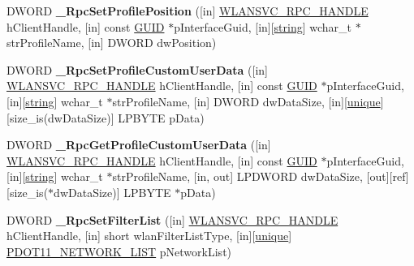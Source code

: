 \begin{DoxyCompactItemize}
\mbox{\label{interfacewlansvc__interface_a1b0f67c02052864e7d274e9784d0d6e6}} 
D\+W\+O\+RD {\bfseries \+\_\+\+Rpc\+Set\+Profile\+Position} (\mbox{[}in\mbox{]} \hyperlink{interfacevoid}{W\+L\+A\+N\+S\+V\+C\+\_\+\+R\+P\+C\+\_\+\+H\+A\+N\+D\+LE} h\+Client\+Handle, \mbox{[}in\mbox{]} const \hyperlink{interface_g_u_i_d}{G\+U\+ID} $\ast$p\+Interface\+Guid, \mbox{[}in\mbox{]}\mbox{[}\hyperlink{structstring}{string}\mbox{]} wchar\+\_\+t $\ast$str\+Profile\+Name, \mbox{[}in\mbox{]} D\+W\+O\+RD dw\+Position)
\item 
\mbox{\label{interfacewlansvc__interface_ab19ff62dcd0c317616f4c5b45f32a83c}} 
D\+W\+O\+RD {\bfseries \+\_\+\+Rpc\+Set\+Profile\+Custom\+User\+Data} (\mbox{[}in\mbox{]} \hyperlink{interfacevoid}{W\+L\+A\+N\+S\+V\+C\+\_\+\+R\+P\+C\+\_\+\+H\+A\+N\+D\+LE} h\+Client\+Handle, \mbox{[}in\mbox{]} const \hyperlink{interface_g_u_i_d}{G\+U\+ID} $\ast$p\+Interface\+Guid, \mbox{[}in\mbox{]}\mbox{[}\hyperlink{structstring}{string}\mbox{]} wchar\+\_\+t $\ast$str\+Profile\+Name, \mbox{[}in\mbox{]} D\+W\+O\+RD dw\+Data\+Size, \mbox{[}in\mbox{]}\mbox{[}\hyperlink{interfaceunique}{unique}\mbox{]}\mbox{[}size\+\_\+is(dw\+Data\+Size)\mbox{]} L\+P\+B\+Y\+TE p\+Data)
\item 
\mbox{\label{interfacewlansvc__interface_a38534f0b37ba05221e47e2567df17a3e}} 
D\+W\+O\+RD {\bfseries \+\_\+\+Rpc\+Get\+Profile\+Custom\+User\+Data} (\mbox{[}in\mbox{]} \hyperlink{interfacevoid}{W\+L\+A\+N\+S\+V\+C\+\_\+\+R\+P\+C\+\_\+\+H\+A\+N\+D\+LE} h\+Client\+Handle, \mbox{[}in\mbox{]} const \hyperlink{interface_g_u_i_d}{G\+U\+ID} $\ast$p\+Interface\+Guid, \mbox{[}in\mbox{]}\mbox{[}\hyperlink{structstring}{string}\mbox{]} wchar\+\_\+t $\ast$str\+Profile\+Name, \mbox{[}in, out\mbox{]} L\+P\+D\+W\+O\+RD dw\+Data\+Size, \mbox{[}out\mbox{]}\mbox{[}ref\mbox{]}\mbox{[}size\+\_\+is($\ast$dw\+Data\+Size)\mbox{]} L\+P\+B\+Y\+TE $\ast$p\+Data)
\item 
\mbox{\label{interfacewlansvc__interface_a75a67ff28b2f883d46927cec9761a3b3}} 
D\+W\+O\+RD {\bfseries \+\_\+\+Rpc\+Set\+Filter\+List} (\mbox{[}in\mbox{]} \hyperlink{interfacevoid}{W\+L\+A\+N\+S\+V\+C\+\_\+\+R\+P\+C\+\_\+\+H\+A\+N\+D\+LE} h\+Client\+Handle, \mbox{[}in\mbox{]} short wlan\+Filter\+List\+Type, \mbox{[}in\mbox{]}\mbox{[}\hyperlink{interfaceunique}{unique}\mbox{]} \hyperlink{struct___d_o_t11___n_e_t_w_o_r_k___l_i_s_t}{P\+D\+O\+T11\+\_\+\+N\+E\+T\+W\+O\+R\+K\+\_\+\+L\+I\+ST} p\+Network\+List)

\end{DoxyCompactItemize}

